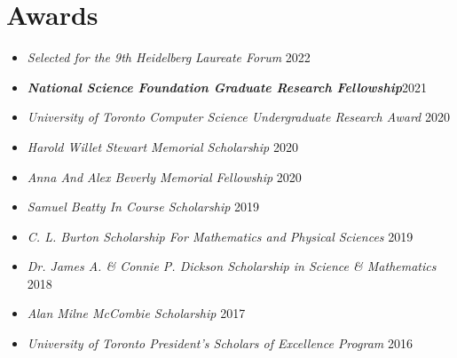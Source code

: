 \documentclass{article}
\begin{document}
    \section{Awards}
    \begin{itemize}
     \setlength\itemsep{.8ex}
     	\item \textsl{Selected for the 9th Heidelberg Laureate Forum} \hfill 2022
    	\item \textbf{\textsl{National Science Foundation Graduate Research Fellowship}}\hfill 2021
        \item \textsl{University of Toronto Computer Science Undergraduate Research Award} \hfill 2020
        \item \textsl{Harold Willet Stewart Memorial Scholarship} \hfill 2020
        \item \textsl{Anna And Alex Beverly Memorial Fellowship} \hfill 2020
        \item \textsl{Samuel Beatty In Course Scholarship} \hfill 2019
        \item \textsl{C. L. Burton Scholarship For Mathematics and Physical Sciences} \hfill 2019
        \item \textsl{Dr. James A. \& Connie P. Dickson Scholarship in Science \& Mathematics} \hfill 2018
        \item \textsl{Alan Milne McCombie Scholarship} \hfill 2017
        \item \textsl{University of Toronto President's Scholars of Excellence Program} \hfill 2016
    \end{itemize}
\end{document}
